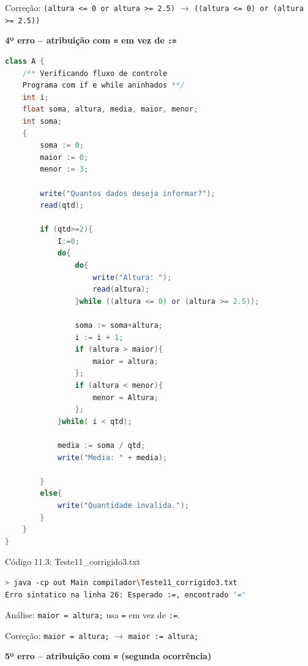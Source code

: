 \documentclass[12pt,a4paper]{article}
\begin{document}
Correção: \texttt{(altura <= 0 or altura >= 2.5)} $\to$ \texttt{((altura <= 0) or (altura >= 2.5))}

\textbf{4º erro -- atribuição com \texttt{=} em vez de \texttt{:=}}

\begin{lstlisting}[language=Java]
class A {
    /** Verificando fluxo de controle
    Programa com if e while aninhados **/
    int i;
    float soma, altura, media, maior, menor;
    int soma;
    {
        soma := 0;
        maior := 0;
        menor := 3;

        write("Quantos dados deseja informar?");
        read(qtd);

        if (qtd>=2){
            I:=0;
            do{
                do{
                    write("Altura: ");
                    read(altura);
                }while ((altura <= 0) or (altura >= 2.5));

                soma := soma+altura;
                i := i + 1;
                if (altura > maior){
                    maior = altura;
                };
                if (altura < menor){
                    menor = Altura;
                };
            }while( i < qtd);

            media := soma / qtd;
            write("Media: " + media);

        }
        else{
            write("Quantidade invalida.");
        }
    }
}
\end{lstlisting}

Código 11.3: Teste11\_corrigido3.txt

\begin{lstlisting}[language=bash]
> java -cp out Main compilador\Teste11_corrigido3.txt
Erro sintatico na linha 26: Esperado :=, encontrado '='
\end{lstlisting}

Análise: \texttt{maior = altura;} usa \texttt{=} em vez de \texttt{:=}.

Correção: \texttt{maior = altura;} $\to$ \texttt{maior := altura;}

\textbf{5º erro -- atribuição com \texttt{=} (segunda ocorrência)}
\end{document}
